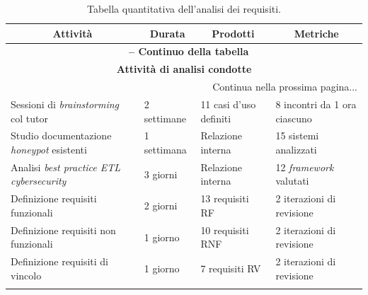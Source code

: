 \begin{center}
\begin{longtable}{|p{}|p{}|p{}|p{}|}
\hline
\multicolumn{1}{|c|}{\textbf{Attività}} & 
\multicolumn{1}{c|}{\textbf{Durata}} & 
\multicolumn{1}{c|}{\textbf{Prodotti}} & 
\multicolumn{1}{c|}{\textbf{Metriche}} \\ 
\hline
\endfirsthead

\multicolumn{4}{c}{{\bfseries \tablename\ \thetable{} -- Continuo della tabella}}\\
\hline
\multicolumn{4}{|c|}{\textbf{Attività di analisi condotte}} \\ \hline
\endhead

\hline \multicolumn{4}{|r|}{{Continua nella prossima pagina...}} \\ \hline
\endfoot

\endlastfoot

Sessioni di \textit{brainstorming} col tutor & 2 settimane & 11 casi d'uso definiti & 8 incontri da 1 ora ciascuno \\ \hline
Studio documentazione \textit{honeypot} esistenti & 1 settimana & Relazione interna & 15 sistemi analizzati \\ \hline
Analisi \textit{best practice ETL cybersecurity} & 3 giorni & Relazione interna & 12 \textit{framework} valutati \\ \hline
Definizione requisiti funzionali & 2 giorni & 13 requisiti RF & 2 iterazioni di revisione \\ \hline
Definizione requisiti non funzionali & 1 giorno & 10 requisiti RNF & 2 iterazioni di revisione \\ \hline
Definizione requisiti di vincolo & 1 giorno & 7 requisiti RV & 2 iterazioni di revisione \\ \hline

\caption{Tabella quantitativa dell'analisi dei requisiti.}
\label{tab:tempistiche-analisi}
\end{longtable}
\end{center}